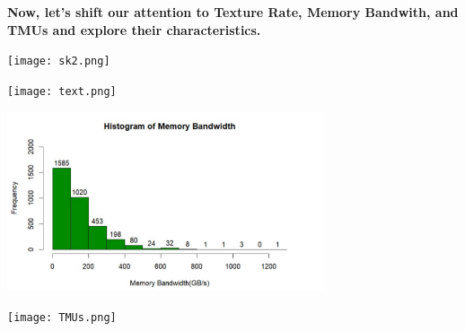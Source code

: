 \textbf{Now, let's shift our attention to Texture Rate, Memory Bandwith, and TMUs and explore their characteristics.}

\begin{center}
    \texttt{[image: sk2.png]}
\end{center}
\begin{center}
    \texttt{[image: text.png]}
\end{center}
\begin{center}
    \includegraphics[width=0.7\textwidth]{bandwidth.png}
\end{center}
\begin{center}
    \texttt{[image: TMUs.png]}
\end{center}


